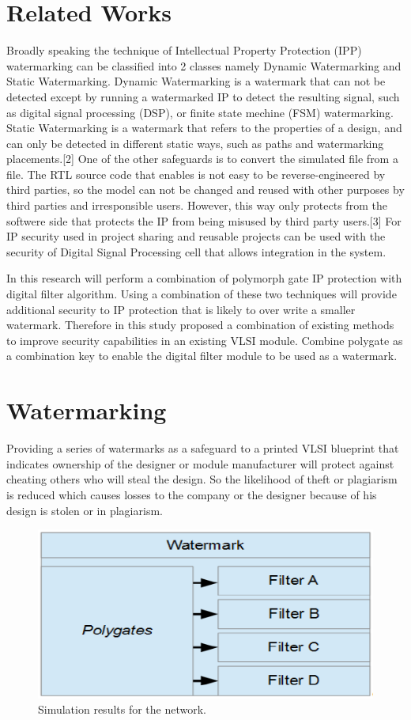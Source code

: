 \documentclass[10pt,journal,compsoc,letterpaper,final]{IEEEtran}
\begin{document}
\section{Related Works}
Broadly speaking the technique of Intellectual Property Protection (IPP) watermarking can be classified into 2 classes namely Dynamic Watermarking and Static Watermarking. Dynamic Watermarking is a watermark that can not be detected except by running a watermarked IP to detect the resulting signal, such as digital signal processing (DSP), or finite state mechine (FSM) watermarking. Static Watermarking is a watermark that refers to the properties of a design, and can only be detected in different static ways, such as paths and watermarking placements.[2] One of the other safeguards is to convert the simulated file from a file. The RTL source code that enables is not easy to be reverse-engineered by third parties, so the model can not be changed and reused with other purposes by third parties and irresponsible users. However, this way only protects from the softwere side that protects the IP from being misused by third party users.[3] For IP security used in project sharing and reusable projects can be used with the security of Digital Signal Processing cell that allows integration in the system.

In this research will perform a combination of polymorph gate IP protection with digital filter algorithm. Using a combination of these two techniques will provide additional security to IP protection that is likely to over write a smaller watermark. Therefore in this study proposed a combination of existing methods to improve security capabilities in an existing VLSI module. Combine polygate as a combination key to enable the digital filter module to be used as a watermark.

\section{Watermarking}
Providing a series of watermarks as a safeguard to a printed VLSI blueprint that indicates ownership of the designer or module manufacturer will protect against cheating others who will steal the design. So the likelihood of theft or plagiarism is reduced which causes losses to the company or the designer because of his design is stolen or in plagiarism.

\begin{figure}
	\centering
	\includegraphics[scale=0.45]{images/box}
	\caption{Simulation results for the network.}
	\label{fig_sim}
\end{figure}
\end{document}

